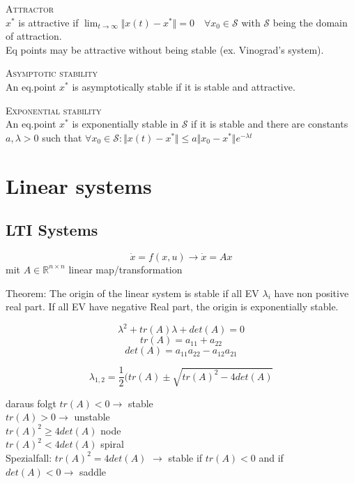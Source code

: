 \textsc{Attractor}\\
$x^*$ is attractive if $\lim_{t\rightarrow \infty} \Vert x(t)-x^* \Vert = 0 \quad \forall x_0 \in \mathcal{S}$ with $\mathcal{S}$ being the domain of attraction.\\
Eq points may be attractive without being stable (ex. Vinograd's system).

\textsc{Asymptotic stability}\\
An eq.point $x^*$ is asymptotically stable if it is stable and attractive.

\textsc{Exponential stability}\\
An eq.point $x^*$ is exponentially stable in $\mathcal{S}$ if it is stable and there are constants $a, \lambda > 0$ such that $\forall x_0 \in \mathcal{S}: \Vert x(t)-x^*\Vert \leq a\Vert x_0 - x^* \Vert e^{-\lambda t}$

\section{Linear systems}
\subsection{LTI Systems}
\[ \dot{x} = f(x,u) \rightarrow \dot{x} = Ax \]
mit $A \in \mathbb{R}^{n \times n}$ linear map/transformation

Theorem:
The origin of the linear system is stable if all EV $\lambda_i$ have non positive real part. If all EV have negative Real part, the origin is exponentially stable.

\[ \lambda^2+tr(A)\lambda+det(A) = 0 \]
\[ tr(A) = a_{11} + a_{22} \]
\[ det(A) = a_{11}a_{22} - a_{12}a_{21} \]

\[ \lambda_{1,2} = \frac{1}{2} (tr(A) \pm \sqrt{tr(A)^2-4det(A)} \]

daraus folgt
$tr(A) < 0 \rightarrow$ stable\\
$tr(A) > 0 \rightarrow$ unstable\\
$tr(A)^2 \geq 4det(A)$ node\\
$tr(A)^2 < 4det(A)$ spiral\\

Spezialfall:
$tr(A)^2 = 4det(A)$ $\rightarrow$ stable if $tr(A) < 0$ and if $det(A) < 0 \rightarrow$ saddle



